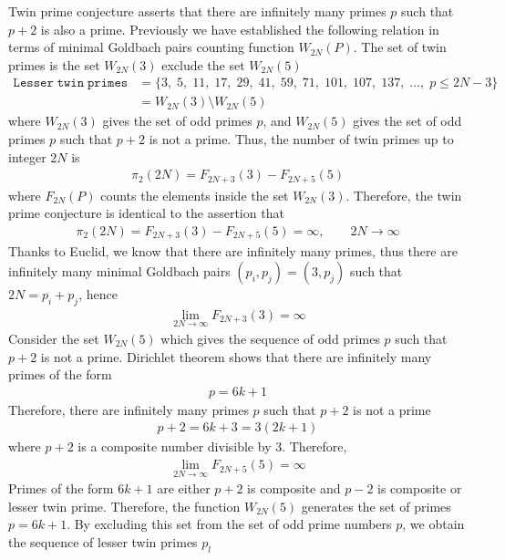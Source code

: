 ﻿Twin prime conjecture asserts that there are infinitely many primes $p$ such that $p+2$ is also a prime.
Previously we have established the following relation in terms of minimal Goldbach pairs counting function
$W_{2N}(P)$.
The set of twin primes is the set $W_{2N}(3)$ exclude the set $W_{2N}(5)$
\begin{align*}
    \mathtt{Lesser \; twin \; primes} &= \{ 3, \; 5, \; 11, \; 17, \; 29, \; 41, \; 59, \; 71, \; 101, \; 107, \; 137, \; \dots, \;  p \leq 2N - 3 \} \\
    &= W_{2N}(3) \setminus W_{2N}(5)
\end{align*}
where $W_{2N}(3)$ gives the set of odd primes $p$, and $W_{2N}(5)$ gives the set of odd primes $p$ such that $p+2$
is not a prime.
Thus, the number of twin primes up to integer $2N$ is
\begin{align*}
    \pi_2 (2N) = F_{2N+3}(3) - F_{2N+5}(5)
\end{align*}
where $F_{2N}(P)$ counts the elements inside the set $W_{2N}(3)$.
Therefore, the twin prime conjecture is identical to the assertion that
\begin{align*}
    \pi_2 (2N) = F_{2N+3}(3) - F_{2N+5}(5) = \infty, \quad \quad 2N\to\infty
\end{align*}
Thanks to Euclid, we know that there are infinitely many primes, thus
there are infinitely many minimal Goldbach pairs $(p_i, p_j) = (3, p_j)$ such that $2N=p_i+p_j$,
hence
\begin{align*}
    \lim_{2N\to\infty} F_{2N+3}(3) = \infty
\end{align*}
Consider the set $W_{2N}(5)$ which gives the sequence of odd primes $p$ such that $p+2$ is not a prime.
Dirichlet theorem shows that there are infinitely many primes of the form
\begin{align*}
    p = 6k+1
\end{align*}
Therefore, there are infinitely many primes $p$ such that $p+2$ is not a prime
\begin{align*}
    p+2 = 6k+3 = 3(2k+1)
\end{align*}
where $p+2$ is a composite number divisible by 3.
Therefore,
\begin{align*}
    \lim_{2N\to\infty} F_{2N+5}(5) = \infty
\end{align*}
Primes of the form $6k+1$ are either $p+2$ is composite and $p-2$ is composite or lesser twin prime.
Therefore, the function $W_{2N}(5)$ generates the set of primes $p=6k+1$.
By excluding this set from the set of odd prime numbers $p$,
we obtain the sequence of lesser twin primes $p_l$
